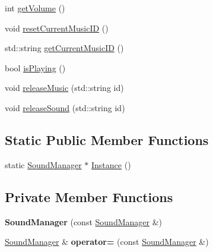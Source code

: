 \begin{DoxyCompactItemize}
\item 
int \mbox{\hyperlink{class_sound_manager_a013d883ce7fce00a50ffcc18b0336e16}{get\+Volume}} ()
\item 
void \mbox{\hyperlink{class_sound_manager_a4d9ace8c2f53124e6eb304a258fc0354}{reset\+Current\+Music\+ID}} ()
\item 
std\+::string \mbox{\hyperlink{class_sound_manager_ae9cccb723db77713287462b57caf7c2d}{get\+Current\+Music\+ID}} ()
\item 
bool \mbox{\hyperlink{class_sound_manager_adfddf5875cfcdcf2c6cf3958b350dc8b}{is\+Playing}} ()
\item 
void \mbox{\hyperlink{class_sound_manager_a527f8e242586e8f5f1fb404a74e6a91e}{release\+Music}} (std\+::string id)
\item 
void \mbox{\hyperlink{class_sound_manager_ab504cbff2c0dfad2b91a43b681e2e4f1}{release\+Sound}} (std\+::string id)
\end{DoxyCompactItemize}
\subsection*{Static Public Member Functions}
\begin{DoxyCompactItemize}
\item 
static \mbox{\hyperlink{class_sound_manager}{Sound\+Manager}} $\ast$ \mbox{\hyperlink{class_sound_manager_a9cf8d653de9d00018fdd646654d2024b}{Instance}} ()
\end{DoxyCompactItemize}
\subsection*{Private Member Functions}
\begin{DoxyCompactItemize}
\item 
\mbox{\label{class_sound_manager_a3505269eb71fc0796284149507c2845b}} 
{\bfseries Sound\+Manager} (const \mbox{\hyperlink{class_sound_manager}{Sound\+Manager}} \&)
\item 
\mbox{\label{class_sound_manager_a2847ac0d3edaadddab88405322f6a764}} 
\mbox{\hyperlink{class_sound_manager}{Sound\+Manager}} \& {\bfseries operator=} (const \mbox{\hyperlink{class_sound_manager}{Sound\+Manager}} \&)
\end{DoxyCompactItemize}
